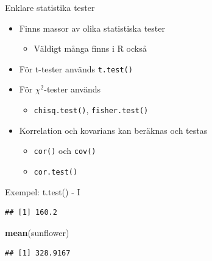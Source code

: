 \documentclass[
  11pt,
  ignorenonframetext,
  handout]{beamer}
\newenvironment{Shaded}{\begin{snugshade}}{\end{snugshade}}
\newcommand{\FunctionTok}[1]{\textcolor[rgb]{0.13,0.29,0.53}{\textbf{#1}}}
\newcommand{\NormalTok}[1]{#1}
\newcommand{\OtherTok}[1]{\textcolor[rgb]{0.56,0.35,0.01}{#1}}
\newcommand{\SpecialCharTok}[1]{\textcolor[rgb]{0.81,0.36,0.00}{\textbf{#1}}}
\newcommand{\StringTok}[1]{\textcolor[rgb]{0.31,0.60,0.02}{#1}}
\providecommand{\tightlist}{%
  \setlength{\itemsep}{0pt}\setlength{\parskip}{0pt}}
\begin{document}
\begin{frame}{Enklare statistika tester}
\label{enklare-statistika-tester}
\begin{itemize}
\tightlist
\item
  Finns massor av olika statistiska tester

  \begin{itemize}
  \tightlist
  \item
    Väldigt många finns i R också
  \end{itemize}
\item
  För t-tester används \texttt{t.test()}
\item
  För \(\chi^2\)-tester används

  \begin{itemize}
  \tightlist
  \item
    \texttt{chisq.test()}, \texttt{fisher.test()}
  \end{itemize}
\item
  Korrelation och kovarians kan beräknas och testas

  \begin{itemize}
  \tightlist
  \item
    \texttt{cor()} och \texttt{cov()}
  \item
    \texttt{cor.test()}
  \end{itemize}
\end{itemize}
\end{frame}

\begin{frame}[fragile]{Exempel: t.test() - I}
\label{exempel-t.test---i}
\begin{Shaded}
\end{Shaded}

\begin{verbatim}
## [1] 160.2
\end{verbatim}

\begin{Shaded}
\begin{Highlighting}[]
\FunctionTok{mean}\NormalTok{(sunflower)}
\end{Highlighting}
\end{Shaded}

\begin{verbatim}
## [1] 328.9167
\end{verbatim}
\end{frame}
\end{document}
